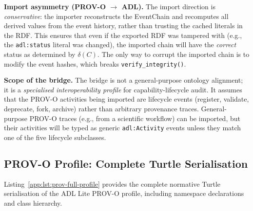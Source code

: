 \textbf{Import asymmetry (PROV-O $\to$ ADL).} The import direction is \emph{conservative}: the importer reconstructs the EventChain and recomputes all derived values from the event history, rather than trusting the cached literals in the RDF. This ensures that even if the exported RDF was tampered with (e.g., the \texttt{adl:status} literal was changed), the imported chain will have the \emph{correct} status as determined by $\delta(C)$. The only way to corrupt the imported chain is to modify the event hashes, which breaks \texttt{verify\_integrity()}.

\textbf{Scope of the bridge.} The bridge is not a general-purpose ontology alignment; it is a \emph{specialised interoperability profile} for capability-lifecycle audit. It assumes that the PROV-O activities being imported are lifecycle events (register, validate, deprecate, fork, archive) rather than arbitrary provenance traces. General-purpose PROV-O traces (e.g., from a scientific workflow) can be imported, but their activities will be typed as generic \texttt{adl:Activity} events unless they match one of the five lifecycle subclasses.

\subsection{PROV-O Profile: Complete Turtle Serialisation}

Listing~\ref{app:lst:prov-full-profile} provides the complete normative Turtle serialisation of the ADL Lite PROV-O profile, including namespace declarations and class hierarchy.

